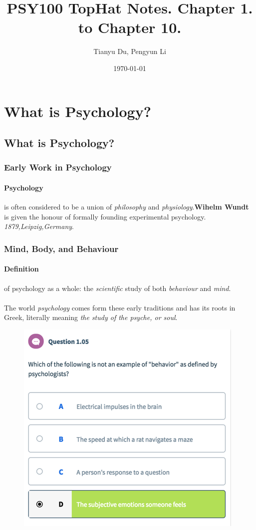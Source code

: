 \documentclass{article}
\author{Tianyu Du, Pengyun Li}
\date{\today}
\title{PSY100 TopHat Notes. Chapter 1. to Chapter 10.}
\begin{document}
	\maketitle
	\doclicenseThis
	\tableofcontents
	\section{What is Psychology?}
	\subsection{What is Psychology?}
	\subsubsection{Early Work in Psychology}
	\paragraph{Psychology} is often considered to be a union of \emph{philosophy} and \emph{physiology}.\textbf{Wihelm Wundt} is given the honour of formally founding experimental psychology. \emph{1879,Leipzig,Germany}.
	\subsubsection{Mind, Body, and Behaviour}
	\paragraph{Definition} of psychology as a whole: the \emph{scientific} study of both \emph{behaviour} and \emph{mind}.
	\paragraph{} The world \emph{psychology} comes form these early traditions and has its roots in Greek, literally meaning \emph{the study of the psyche, or soul}.
	\begin{figure}[H]
		\centering
		\includegraphics{psy100/0105}
	\end{figure}
\end{document}
